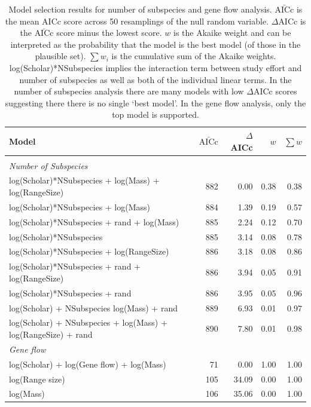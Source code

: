 \begin{table}[t]
\centering
\caption[Model selection results for number of subspecies analysis]{
Model selection results for number of subspecies and gene flow analysis. 
$\bar{\text{AICc}}$ is the mean AICc score across 50 resamplings of the null random variable. 
$\Delta$AICc is the $\bar{\text{AICc}}$ score minus the lowest score. 
$w$ is the Akaike weight and can be interpreted as the probability that the model is the best model (of those in the plausible set).
$\sum w_i$ is the cumulative sum of the Akaike weights.
log(Scholar)*NSubspecies implies the interaction term between study effort and number of subspecies as well as both of the individual linear terms.
In the number of subspecies analysis there are many models with low $\Delta$AICc scores suggesting there there is no single `best model'.
In the gene flow analysis, only the top model is supported.
}

\begin{tabular}{@{}>{\footnotesize}p{8cm}rrrr@{}}

\toprule
\normalsize{Model} & $\bar{\text{AICc}}$ & $\Delta$AICc & $w$ & $\sum w$\\
\midrule
&&&&\\[-3mm]
\textit{\small{Number of Subspecies}} &&&&\\
log(Scholar)*NSubspecies  + log(Mass) + log(RangeSize) & 
882 & 0.00 &
0.38 & 0.38\\
log(Scholar)*NSubspecies  + log(Mass) & 
884 & 1.39 &
0.19 & 0.57\\
log(Scholar)*NSubspecies + rand + log(Mass) & 
885 & 2.24 &
0.12 & 0.70\\
log(Scholar)*NSubspecies  & 
885 & 3.14 &
0.08 & 0.78\\
log(Scholar)*NSubspecies  + log(RangeSize) & 
886 & 3.18 &
0.08 & 0.86\\
log(Scholar)*NSubspecies  + rand + log(RangeSize) & 
886 & 3.94 &
0.05 & 0.91\\
log(Scholar)*NSubspecies  + rand & 
886 & 3.95 &
0.05 & 0.96\\
log(Scholar) + NSubspecies log(Mass) + rand & 
889 & 6.93 &
0.01 & 0.97\\
log(Scholar) + NSubspecies + log(Mass) + log(RangeSize) + rand& 
890 & 7.80 &
0.01 & 0.98\\[3mm]
\textit{\small{Gene flow}} &&&&\\
log(Scholar) + log(Gene flow) + log(Mass) & 
71 & 0.00 &
1.00 & 1.00\\
log(Range size) & 
105 & 34.09 &
0.00 & 1.00\\
log(Mass) & 
106 & 35.06 &
0.00 & 1.00\\
\bottomrule
\end{tabular}

\label{t:models}
\end{table}

